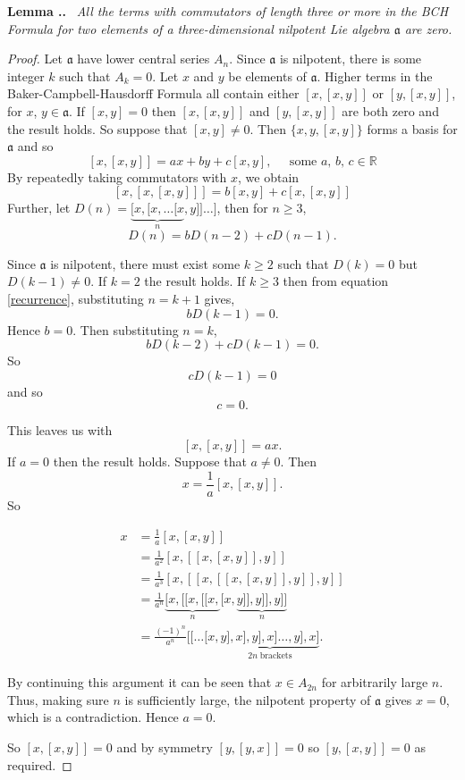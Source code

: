 \documentclass[honours]{UNSWthesis}
\newcommand{\R}{\mathbb{R}}
\newcommand{\1}{\mathbf{e}_{1}}
\newcommand{\2}{\mathbf{e}_{3}}
\newcommand{\3}{\mathbf{e}_{3}}
\newcounter{Item}[section]
\newenvironment{Lemma}{\medskip
                            \refstepcounter{Item}
                            \noindent
                           {\bf Lemma \thesection.\theItem.}\ %
                            \begingroup \sl}
                           {\endgroup\medskip}
\begin{document}
\begin{Lemma}
All the terms with commutators of length three or more in the BCH Formula for two elements of a three-dimensional nilpotent Lie algebra $\mathfrak{a}$ are zero.
\end{Lemma}


\begin{proof} 
Let $\mathfrak{a}$ have lower central series $A_{n}$. Since $\mathfrak{a}$ is nilpotent, there is some integer $k$ such that $A_{k}=0$.\newline
Let $x$ and $y$ be elements of $\mathfrak{a}$.
Higher terms in the Baker-Campbell-Hausdorff Formula all contain either $[x,[x,y]]$ or $[y,[x,y]]$, for $x$, $y \in \mathfrak{a}$. If $[x,y]=0$ then $[x,[x,y]]$ and $[y,[x,y]]$ are both zero and the result holds. So suppose that $[x,y] \neq 0$. Then $\{x,y,[x,y]\}$ forms a basis for $\mathfrak{a}$ and so
\[
[x,[x,y]]=ax+by+c[x,y], \;\;\;\;\; \text{some $a$, $b$, $c \in \R$}
\]
By repeatedly taking commutators with $x$, we obtain
\[
[x,[x,[x,y]]]=b[x,y]+c[x,[x,y]]
\]
Further, let $D(n)=\underbrace{[x,[x,\ldots[x}_{n},y]] \ldots ]$, then for $n \geq 3$,
\begin{equation}\label{recurrence}
D(n)=bD(n-2)+cD(n-1).
\end{equation}

Since $\mathfrak{a}$ is nilpotent, there must exist some $k \geq 2$ such that $D(k)=0$ but $D(k-1) \neq 0$. If $k=2$ the result holds. If $k \geq 3$ then from equation \ref{recurrence}, substituting $n=k+1$ gives,
\[
bD(k-1)=0
.\] Hence $b=0$.
Then substituting $n=k$,
\[
bD(k-2)+cD(k-1)=0
.\] So
\[
cD(k-1)=0
\] and so
\[
c=0.
\]

This leaves us with 
\[
[x,[x,y]]=ax.
\]
If $a=0$ then the result holds. Suppose that $a \neq 0$. Then $$x=\frac{1}{a}[x,[x,y]].$$ So

\begin{align*}
x &= \frac{1}{a}[x,[x,y]] \\
&= \frac{1}{a^{2}}[x,[[x,[x,y]],y]] \\
&=\frac{1}{a^{3}}[x,[[x,[[x,[x,y]],y]],y]] \\
&=\frac{1}{a^{n}}\underbrace{[x,[[x,[[x,}_{n}[x,\underbrace{y]],y]],y]]}_{n}\\
&=\frac{(-1)^{n}}{a^{n}}[[\ldots[x,\underbrace{y],x],y],x]\ldots,y],x]}_{2n\; \text{brackets}} .
\end{align*}

By continuing this argument it can be seen that $x \in A_{2n}$ for arbitrarily large $n$. Thus, making sure $n$ is sufficiently large, the nilpotent property of $\mathfrak{a}$ gives $x=0$, which is a contradiction. Hence $a=0$.

So $[x,[x,y]]=0$ and by symmetry $[y,[y,x]]=0$ so $[y,[x,y]]=0$ as required.
\end{proof}
\end{document}
